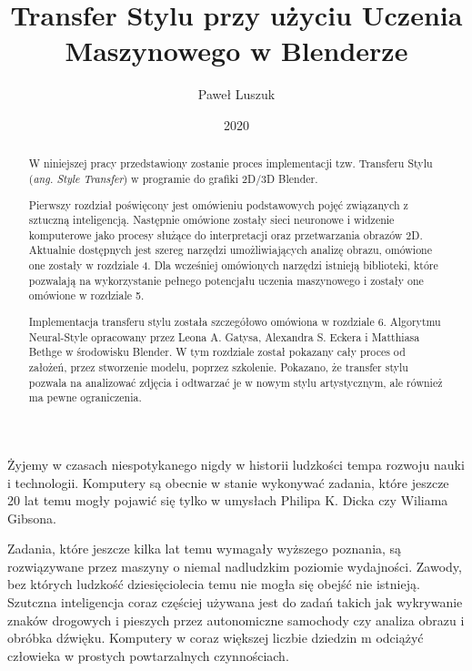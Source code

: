 \documentclass[brudnopis]{xmgr}
\author   {Paweł Luszuk}
\title    {Transfer Stylu przy użyciu Uczenia Maszynowego w Blenderze}
\date     {2020}
\begin{document}
\begin{abstract}

W niniejszej pracy przedstawiony zostanie proces implementacji tzw. Transferu Stylu (\textit{ang. Style Transfer}) w programie do grafiki 2D/3D Blender.

Pierwszy rozdział poświęcony jest omówieniu podstawowych pojęć związanych z sztuczną inteligencją. Następnie omówione zostały sieci neuronowe i widzenie komputerowe jako procesy służące do interpretacji oraz przetwarzania obrazów 2D. Aktualnie dostępnych jest szereg narzędzi umożliwiających analizę obrazu, omówione one zostały w rozdziale 4. Dla wcześniej omówionych narzędzi istnieją biblioteki, które pozwalają na wykorzystanie pełnego potencjału uczenia maszynowego i zostały one omówione w rozdziale 5.

Implementacja transferu stylu została szczegółowo omówiona w rozdziale 6. Algorytmu Neural-Style opracowany przez Leona A. Gatysa, Alexandra S. Eckera i Matthiasa Bethge w środowisku Blender. W tym rozdziale został pokazany cały proces od założeń, przez stworzenie modelu, poprzez szkolenie. Pokazano, że transfer stylu pozwala na analizować zdjęcia i odtwarzać je w nowym stylu artystycznym, ale również ma pewne ograniczenia. 


\end{abstract}


\maketitle

\introduction

Żyjemy w czasach niespotykanego nigdy w historii ludzkości tempa rozwoju nauki i technologii. Komputery są obecnie w stanie wykonywać zadania, które jeszcze 20 lat temu mogły pojawić się tylko w umysłach Philipa K. Dicka czy Wiliama Gibsona.

Zadania, które jeszcze kilka lat temu wymagały wyższego poznania, są rozwiązywane przez maszyny o niemal nadludzkim poziomie wydajności. Zawody, bez których ludzkość dziesięciolecia temu nie mogła się obejść nie istnieją. Szutczna inteligencja coraz częściej używana jest do zadań takich jak wykrywanie znaków drogowych i pieszych przez autonomiczne samochody czy analiza obrazu i obróbka dźwięku. Komputery w coraz większej liczbie dziedzin m odciążyć człowieka w prostych powtarzalnych czynnościach.
\end{document}

